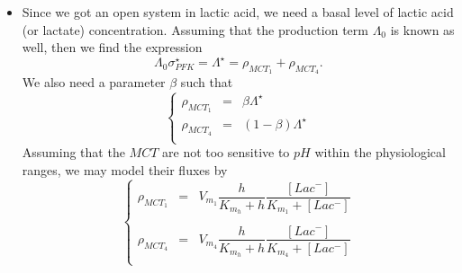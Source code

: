 \documentclass{revtex4}
\begin{document}
\begin{itemize}
\item Since we got an open system in lactic acid, we need a basal level of lactic acid (or lactate) concentration.
Assuming that the production term $\Lambda_0$ is known as well, then we find the expression
\begin{equation}
	\Lambda_0 \sigma_{PFK}^\star = \Lambda^\star = \rho_{MCT_1} + \rho_{MCT_4}.
\end{equation}
We also need a parameter $\beta$ such that
\begin{equation}
	\left\lbrace
	\begin{array}{rcr}
	\rho_{MCT_1} & = & \beta \Lambda^\star\\
	\rho_{MCT_4} & = & (1-\beta) \Lambda^\star\\
	\end{array}
	\right.
\end{equation}
Assuming that the $MCT$ are not too sensitive to $pH$ within the physiological ranges, we may model their fluxes by
\begin{equation}
	\left\lbrace
	\begin{array}{rcl}
	\rho_{MCT_1} & = & V_{m_1} \dfrac{h}{K_{m_h}+h} \dfrac{\left[Lac^-\right]}{K_{m_1}+\left[Lac^-\right]}\\
	\\
	\rho_{MCT_4} & = & V_{m_4} \dfrac{h}{K_{m_h}+h} \dfrac{\left[Lac^-\right]}{K_{m_4}+\left[Lac^-\right]}\\
	\end{array}
	\right.
\end{equation}

\end{itemize}
\end{document}
